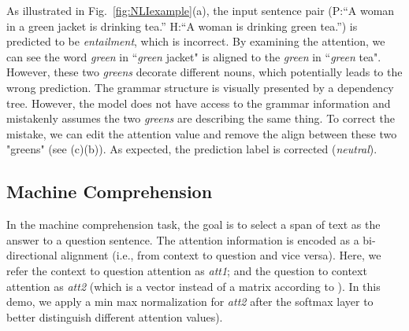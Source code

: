 As illustrated in Fig.~\ref{fig:NLIexample}(a), the input sentence pair (P:``A woman in a green jacket is drinking tea.'' H:``A woman is drinking green tea.'') is predicted to be \emph{entailment}, which is incorrect.
By examining the attention, we can see the word \emph{green} in ``\emph{green} jacket" is aligned to the \emph{green} in ``\emph{green} tea". However, these two \emph{greens} decorate different nouns, which potentially leads to the wrong prediction. The grammar structure is visually presented by a dependency tree.
However, the model does not have access to the grammar information and mistakenly assumes the two \emph{greens} are describing the same thing.
%
To correct the mistake, we can edit the attention value and remove the align between these two "greens" (see (c)(b)).
As expected, the prediction label is corrected (\emph{neutral}).

\subsection{Machine Comprehension}
\label{sec:MCexample}
In the machine comprehension task, the goal is to select a span of text as the answer
to a question sentence.
The attention information is encoded as a bi-directional alignment (i.e., from context to question and vice versa). 
Here, we refer the context to question attention as \emph{att1}; and the question to context attention as \emph{att2} (which is a vector instead of a matrix according to \citet{Seo2016}). In this demo, we apply a min max normalization for \emph{att2} after the softmax layer to better distinguish different attention values).

